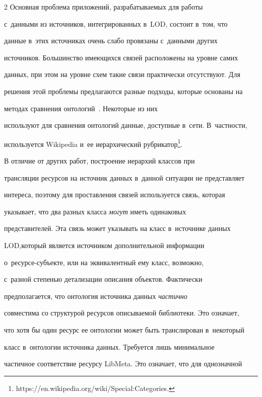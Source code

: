 \begin{multicols}{2}
    Основная проблема приложений, разрабатыва\-емых для работы 

с~данными из источников, интегрированных в~LOD, состоит в~том, что 

данные в~этих источниках очень слабо провязаны с~данными других 

источников. Большинство имеющихся связей расположены на уровне самих 

данных, при этом на уровне схем такие связи практически отсутствуют. Для 

решения этой проблемы предлагаются разные подходы, которые основаны на 

методах сравнения онтологий~\cite{1-ser, 4-ser}. Некоторые из них 

используют для сравнения онтологий данные, доступные в~сети. В~част\-ности, 

используется Wikipedia и~ее иерархический рубрикатор\footnote{{\sf  

https://en.wikipedia.org/wiki/Special:Categories.}}. 

    

    В отличие от других работ, построение иерархий классов при 

трансляции ресурсов на источник данных в~данной ситуации не представляет 

интереса, поэтому для проставления связей используется связь, которая 

указывает, что два разных класса \textit{могут} иметь одинаковых 

представителей. Эта связь может указывать на класс в~источнике данных 

LOD,\linebreak который является источником дополнительной информа\-ции  

о~ре\-сур\-се-субъ\-ек\-те, или на эквивалентный ему класс, возможно, 

с~разной степенью детализации описания объектов. Фактически 

предполагается, что онтология источника данных \textit{час\-тич\-но} 

совместима со структурой ресурсов описываемой библиотеки. Это означает, 

что хотя бы один ресурс ее онтологии может быть транслирован в~некоторый 

класс в~онтологии источника данных. Требуется лишь минимальное 

частичное соответствие ресурсу LibMeta. Это означает, что для однозначной 


\end{multicols}
